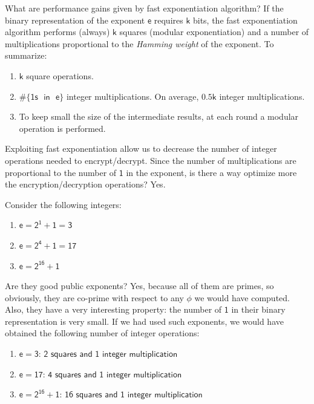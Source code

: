 \documentclass{article}
\begin{document}
\par \noindent What are performance gains given by fast exponentiation algorithm? If the binary representation of the exponent $\mathsf{e}$ requires $\mathsf{k}$ bits, the fast exponentiation algorithm performs (always) $\mathsf{k}$ squares (modular exponentiation) and a number of multiplications proportional to the \textit{Hamming weight} of the exponent. To summarize:

\begin{enumerate}
    \item $\mathsf{k}$ square operations.
    \item $\mathsf{\#\{ 1s \text{ } in \text{ } e\}}$ integer multiplications. On average, $\mathsf{0.5k}$ integer multiplications.
    \item To keep small the size of the intermediate results, at each round a modular operation is performed.
\end{enumerate}

\par \noindent Exploiting fast exponentiation allow us to decrease the number of integer operations needed to encrypt/decrypt. Since the number of multiplications are proportional to the number of $\mathsf{1}$ in the exponent, is there a way optimize more the encryption/decryption operations? Yes.

Consider the following integers:

\begin{enumerate}
    \item $\mathsf{e = 2^1 + 1 = 3}$
    \item $\mathsf{e = 2^4 + 1 = 17}$
    \item $\mathsf{e = 2^{16} + 1}$
\end{enumerate}

\par \noindent Are they good public exponents? Yes, because all of them are primes, so obviously, they are co-prime with respect to any $\mathsf{\phi}$ we would have computed. Also, they have a very interesting property: the number of $\mathsf{1}$ in their binary representation is very small. If we had used such exponents, we would have obtained the following number of integer operations: 

\begin{enumerate}
    \item $\mathsf{e = 3 \text{: } 2 \text{ squares and } 1 \text{ integer multiplication}}$
    \item $\mathsf{e = 17 \text{: } 4 \text{ squares and } 1 \text{ integer multiplication}}$
    \item $\mathsf{e = 2^{16} + 1 \text{: } 16 \text{ squares and } 1 \text{ integer multiplication}}$
\end{enumerate}
\end{document}
